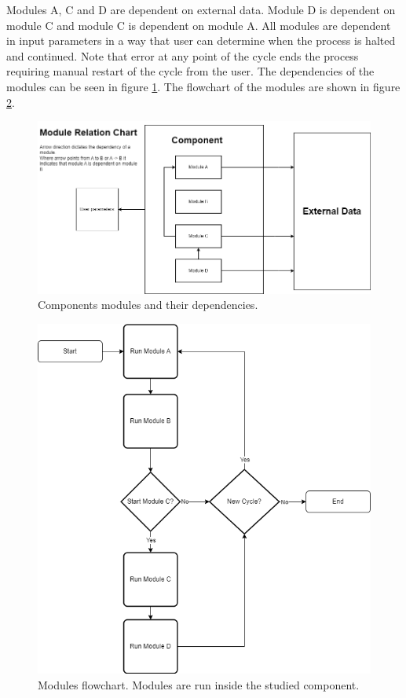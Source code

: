 Modules A, C and D are dependent on external data.
Module D is dependent on module C and module C is dependent on module A.
All modules are dependent in input parameters in a way that user can determine when the process is halted and continued.
Note that error at any point of the cycle ends the process requiring manual restart of the cycle from the user.
The dependencies of the modules can be seen in figure \ref{figure:module:relation}.
The flowchart of the modules are shown in figure \ref{figure:module:flow}.

\begin{figure}
    \includegraphics[width=\textwidth]{images/modules_relation_uml.png}
    \caption{Components modules and their dependencies.}
    \label{figure:module:relation}
\end{figure}


\begin{figure}
    \includegraphics[width=\textwidth]{images/module_flow_chart.png}
    \caption{Modules flowchart. Modules are run inside the studied component.}
    \label{figure:module:flow}
\end{figure}


